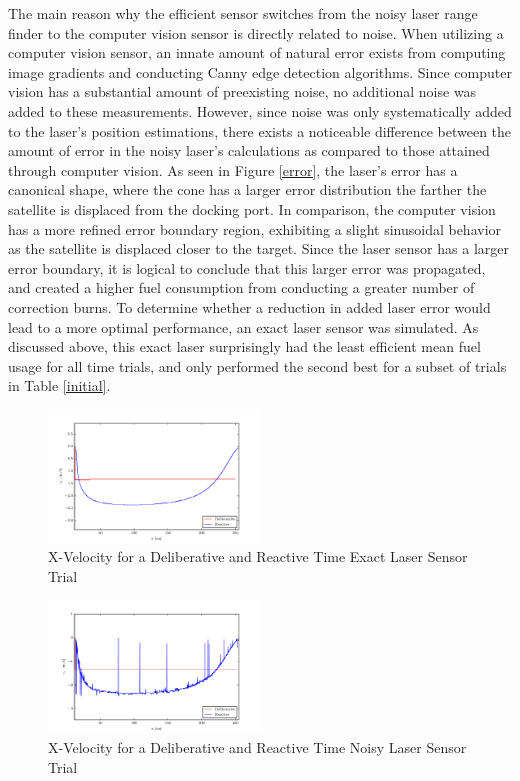 \documentclass[journal, 10pt]{IEEEtran}
\begin{document}
The main reason why the efficient sensor switches from the noisy laser range finder to the computer vision sensor is directly related to noise. When utilizing a computer vision sensor, an innate amount of natural error exists from computing image gradients and conducting Canny edge detection algorithms. Since computer vision has a substantial amount of preexisting noise, no additional noise was added to these measurements. However, since noise was only systematically added to the laser's position estimations, there exists a noticeable difference between the amount of error in the noisy laser's calculations as compared to those attained through computer vision. As seen in Figure \ref{error}, the laser's error has a canonical shape, where the cone has a larger error distribution the farther the satellite is displaced from the docking port. In comparison, the computer vision has a more refined error boundary region, exhibiting a slight sinusoidal behavior as the satellite is displaced closer to the target. Since the laser sensor has a larger error boundary, it is logical to conclude that this larger error was propagated, and created a higher fuel consumption from conducting a greater number of correction burns. To determine whether a reduction in added laser error would lead to a more optimal performance, an exact laser sensor was simulated. As discussed above, this exact laser surprisingly had the least efficient mean fuel usage for all time trials, and only performed the second best for a subset of trials in Table \ref{initial}. 


\begin{figure}[tb]
\begin{center}
\includegraphics[width=0.5\textwidth]{figures/xVelocityClean.pdf}
\caption{X-Velocity for a Deliberative and Reactive Time Exact Laser Sensor Trial }
\label{xClean_velocity}
\end{center}
\end{figure}

\begin{figure}[tb]
\begin{center}
\includegraphics[width=0.5\textwidth]{figures/xVelocityNoisy.pdf}
\caption{X-Velocity for a Deliberative and Reactive Time Noisy Laser Sensor Trial }
\label{xNoise_velocity}
\end{center}
\end{figure}
\end{document}
